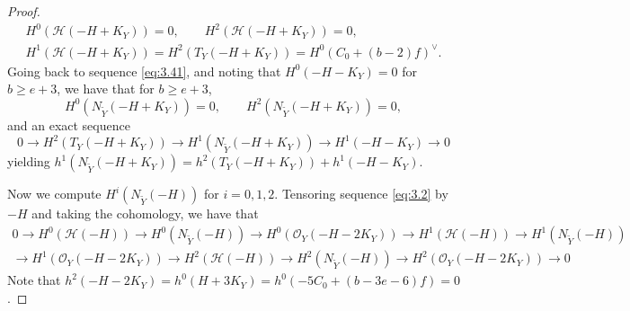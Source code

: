\documentclass[11pt,reqno]{amsart}
\theoremstyle{plain}
\theoremstyle{definition}
\newcommand{\OO}{\mathcal{O}}
\newcommand{\Yt}{\widetilde{Y}}
\newcommand{\NYt}{N_{\Yt}}
\newcommand{\Hc}{\mathcal{H}}
\begin{document}
\begin{proof}
\begin{equation}
\begin{gathered}
H^0(\Hc(-H+K_Y))=0,\qquad H^2(\Hc(-H+K_Y))=0,\\
H^1(\Hc(-H+K_Y))=H^2(T_Y(-H+K_Y))=H^0(C_0+(b-2)f)^{\vee}.
\end{gathered}
\end{equation}
Going back to sequence \eqref{eq:3.41}, and noting that $H^0(-H-K_Y)=0$ for $b\ge e+3$, we have that for $b\ge e+3$,
\begin{equation}\label{eq:3.49}
H^0(\NYt(-H+K_Y))=0,\qquad H^2(\NYt(-H+K_Y))=0,
\end{equation}
and an exact sequence
\begin{equation}\label{eq:3.50}
0\to H^2(T_Y(-H+K_Y))\to H^1(\NYt(-H+K_Y))\to H^1(-H-K_Y)\to 0
\end{equation}
yielding $h^1(\NYt(-H+K_Y))=h^2(T_Y(-H+K_Y))+h^1(-H-K_Y)$.

Now we compute $H^i(\NYt(-H))$ for $i=0,1,2$. Tensoring sequence \eqref{eq:3.2} by $-H$ and taking the cohomology, we have that
\begin{multline}\label{eq:3.51}
0\to H^0(\Hc(-H))\to H^0(\NYt(-H))\to H^0(\OO_Y(-H-2K_Y))\to H^1(\Hc(-H))\to H^1(\NYt(-H))\\
\to H^1(\OO_Y(-H-2K_Y))\to H^2(\Hc(-H))\to H^2(\NYt(-H))\to H^2(\OO_Y(-H-2K_Y))\to 0
\end{multline}
Note that $h^2(-H-2K_Y)=h^0(H+3K_Y)=h^0(-5C_0+(b-3e-6)f)=0$. %


\end{proof}
\end{document}
